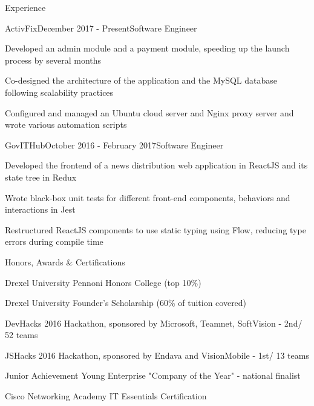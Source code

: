 \documentclass{resume} %
\begin{document}
\begin{rSection}{Experience}

\begin{rSubsection}{ActivFix}{December 2017 - Present}{Software Engineer}{}
\item Developed an admin module and a payment module, speeding up the launch process by several months
\item Co-designed the architecture of the application and the MySQL database following scalability practices
\item Configured and managed an Ubuntu cloud server and Nginx proxy server and wrote various automation scripts
\end{rSubsection}



\begin{rSubsection}{GovITHub}{October 2016 - February 2017}{Software Engineer}{}
\item Developed the frontend of a news distribution web application in ReactJS and its state tree in Redux
\item Wrote black-box unit tests for different front-end components, behaviors and interactions in Jest
\item Restructured ReactJS components to use static typing using Flow, reducing type errors during compile time
\end{rSubsection}

\end{rSection}


\begin{rSection}{Honors, Awards \& Certifications}
\begin{rSubsection}{}{}{}{}
\item Drexel University Pennoni Honors College (top 10\%)
\item Drexel University Founder’s Scholarship (60\% of tuition covered)
\item DevHacks 2016 Hackathon, sponsored by Microsoft, Teamnet, SoftVision - 2nd/ 52 teams
\item JSHacks 2016 Hackathon, sponsored by Endava and VisionMobile - 1st/ 13 teams
\item Junior Achievement Young Enterprise "Company of the Year" - national finalist
\item Cisco Networking Academy IT Essentials Certification
\end{rSubsection}
\end{rSection}
\end{document}

